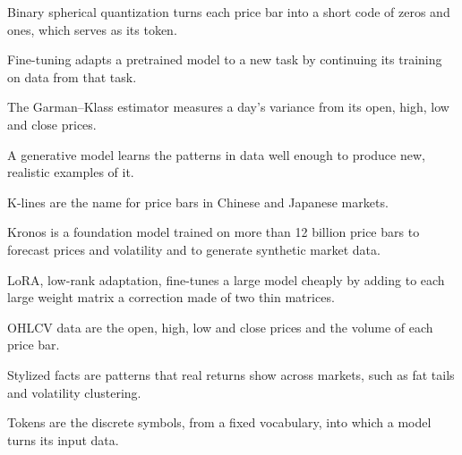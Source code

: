 \begin{keyterms}
\footnotesize
\begin{description}[leftmargin=0pt, itemsep=0pt, parsep=0pt, topsep=0pt, font=\normalfont\bfseries\color{FEMaroon}]
  \item[Binary spherical quantization.] Binary spherical quantization turns each price bar into a short code of zeros and ones, which serves as its token.
  \item[Fine-tuning.] Fine-tuning adapts a pretrained model to a new task by continuing its training on data from that task.
  \item[Garman--Klass estimator.] The Garman--Klass estimator measures a day's variance from its open, high, low and close prices.
  \item[Generative model.] A generative model learns the patterns in data well enough to produce new, realistic examples of it.
  \item[K-lines.] K-lines are the name for price bars in Chinese and Japanese markets.
  \item[Kronos.] Kronos is a foundation model trained on more than 12 billion price bars to forecast prices and volatility and to generate synthetic market data.
  \item[LoRA.] LoRA, low-rank adaptation, fine-tunes a large model cheaply by adding to each large weight matrix a correction made of two thin matrices.
  \item[OHLCV.] OHLCV data are the open, high, low and close prices and the volume of each price bar.
  \item[Stylized facts.] Stylized facts are patterns that real returns show across markets, such as fat tails and volatility clustering.
  \item[Tokens.] Tokens are the discrete symbols, from a fixed vocabulary, into which a model turns its input data.
\end{description}
\end{keyterms}
